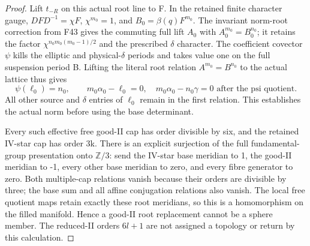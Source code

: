 \begin{proof}
Lift \(t_{-R}\) on this actual root line to F. In the retained finite
character gauge, \(DFD^{-1}=\chi F\), \(\chi^{m_0}=1\), and
\(B_0=\beta(q)F^{m_0}\). The invariant norm-root correction from F43 gives
the commuting full lift \(A_0\) with \(A_0^{m_0}=B_0^{n_0}\); it retains the
factor \(\chi^{n_0m_0(m_0-1)/2}\) and the prescribed \(\delta\) character.
The coefficient covector \(\psi\) kills the elliptic and physical-\(\delta\)
periods and takes value one on the full suspension period B. Lifting
the literal root relation \(A^{m_0}=B^{n_0}\) to the actual lattice thus
gives
\[
 \psi(\ell_0)=n_0,\qquad
          m_0\alpha_0-\ell_0=0,
          \quad m_0\alpha_0-n_0\gamma=0
                       \text{ after the psi quotient}. \tag{OT.31}
\]
All other source and \(\delta\) entries of \(\ell_0\) remain in the first
relation. This establishes the actual norm before using the base
determinant.

Every such effective free good-II cap has order divisible by six, and
the retained IV-star cap has order 3k. There is an explicit surjection
of the full fundamental-group presentation onto \(\mathbb Z/3\): send the
IV-star base meridian to 1, the good-II meridian to -1, every other
base meridian to zero, and every fibre generator to zero. Both
multiple-cap relations vanish because their orders are divisible by
three; the base sum and all affine conjugation relations also vanish.
The local free quotient maps retain exactly these root meridians, so
this is a homomorphism on the filled manifold. Hence a good-II root
replacement cannot be a sphere member. The reduced-II orders
\(6l+1\) are not assigned a topology or return by this calculation.

\end{proof}
